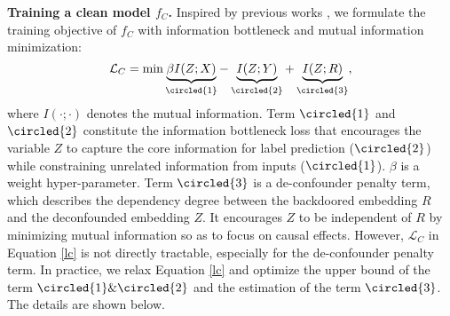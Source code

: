 \noindent\textbf{Training a clean model $f_C$.}
Inspired by previous works \cite{guo2019learning, huang2021disenqnet}, we formulate the training objective of $f_C$ with information bottleneck and mutual information minimization:
\begin{equation}
    \mathcal{L}_C={\rm min}\underbrace{\beta I(Z; X)}_{\circled{1}}- \underbrace{I(Z; Y)}_{\circled{2}}+\underbrace{I(Z; R)}_{\circled{3}},
    \vspace{-1em}
\label{lc}
\end{equation}
where $I(\cdot; \cdot)$ denotes the mutual information. Term $\circled{1}$ and $\circled{2}$ constitute the information bottleneck loss \cite{tishby2000information} that encourages the variable $Z$ to capture the core information for label prediction ($\circled{2}$) while constraining unrelated information from inputs ($\circled{1}$). $\beta$ is a weight hyper-parameter. Term $\circled{3}$ is a de-confounder penalty term, which describes the dependency degree between the backdoored embedding $R$ and the deconfounded embedding $Z$. It encourages $Z$ to be independent of $R$ by minimizing mutual information so as to focus on causal effects.
However, $\mathcal{L}_C$ in Equation \ref{lc} is not directly tractable, especially for the de-confounder penalty term. %
In practice, we relax Equation \ref{lc} and optimize the upper bound of the term $\circled{1}\&\circled{2}$ and the estimation of the term $\circled{3}$. The details are shown below.

